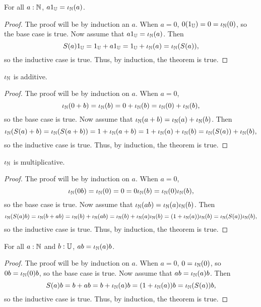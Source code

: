 \documentclass[../math.tex]{subfiles}
\begin{document}
\begin{theorem}
    For all $a : \mathbb{N}$, $a1_{\mathbb{U}} = \iota_{\mathbb{N}}(a)$.
\end{theorem}
\begin{proof}
    The proof will be by induction an $a$.  When $a = 0$, $0(1_{\mathbb{U}}) = 0 =
    \iota_{\mathbb{N}}(0)$, so the base case is true.  Now assume that $a1_{\mathbb{U}} = \iota_{\mathbb{N}}(a)$.  Then
    \[
        S(a)1_{\mathbb{U}} = 1_{\mathbb{U}} + a1_{\mathbb{U}} = 1_{\mathbb{U}} + \iota_{\mathbb{N}}(a) = \iota_{\mathbb{N}}(S(a)),
    \]
    so the inductive case is true.  Thus, by induction, the theorem is true.
\end{proof}

\begin{instance}
    $\iota_{\mathbb{N}}$ is additive.
\end{instance}
\begin{proof}
    The proof will be by induction on $a$.  When $a = 0$,
    \[
        \iota_{\mathbb{N}}(0 + b) = \iota_{\mathbb{N}}(b) = 0 + \iota_{\mathbb{N}}(b) = \iota_{\mathbb{N}}(0) + \iota_{\mathbb{N}}(b),
    \]
    so the base case is true.  Now assume that $\iota_{\mathbb{N}}(a + b) = \iota_{\mathbb{N}}(a) + \iota_{\mathbb{N}}(b)$.
    Then
    \[
        \iota_{\mathbb{N}}(S(a) + b) = \iota_{\mathbb{N}}(S(a + b)) = 1 + \iota_{\mathbb{N}}(a + b) = 1 + \iota_{\mathbb{N}}(a) + \iota_{\mathbb{N}}(b) =
        \iota_{\mathbb{N}}(S(a)) + \iota_{\mathbb{N}}(b),
    \]
    so the inductive case is true.  Thus, by induction, the theorem is true.
\end{proof}

\begin{instance}
    $\iota_{\mathbb{N}}$ is multiplicative.
\end{instance}
\begin{proof}
    The proof will be by induction on $a$.  When $a = 0$,
    \[
        \iota_{\mathbb{N}}(0b) = \iota_{\mathbb{N}}(0) = 0 = 0\iota_{\mathbb{N}}(b) = \iota_{\mathbb{N}}(0)\iota_{\mathbb{N}}(b),
    \]
    so the base case is true.  Now assume that $\iota_{\mathbb{N}}(ab) = \iota_{\mathbb{N}}(a)\iota_{\mathbb{N}}(b)$.
    Then
    \[
        \iota_{\mathbb{N}}(S(a)b) = \iota_{\mathbb{N}}(b + ab) = \iota_{\mathbb{N}}(b) + \iota_{\mathbb{N}}(ab) = \iota_{\mathbb{N}}(b) + \iota_{\mathbb{N}}(a)\iota_{\mathbb{N}}(b) =
        (1 + \iota_{\mathbb{N}}(a)) \iota_{\mathbb{N}}(b) = \iota_{\mathbb{N}}(S(a))\iota_{\mathbb{N}}(b),
    \]
    so the inductive case is true.  Thus, by induction, the theorem is true.
\end{proof}

\begin{theorem}
    For all $a : \mathbb{N}$ and $b : \mathbb{U}$, $ab = \iota_{\mathbb{N}}(a)b$.
\end{theorem}
\begin{proof}
    The proof will be by induction on $a$.  When $a = 0$, $0 = \iota_{\mathbb{N}}(0)$, so $0b =
    \iota_{\mathbb{N}}(0)b$, so the base case is true.  Now assume that $ab = \iota_{\mathbb{N}}(a)b$.  Then
    \[
        S(a)b = b + ab = b + \iota_{\mathbb{N}}(a)b = (1 + \iota_{\mathbb{N}}(a))b = \iota_{\mathbb{N}}(S(a))b,
    \]
    so the inductive case is true.  Thus, by induction, the theorem is true.
\end{proof}
\end{document}
